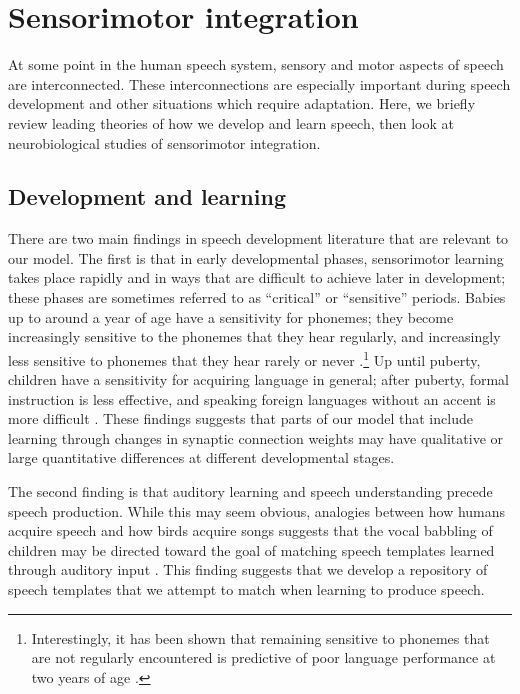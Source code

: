 \section{Sensorimotor integration}

At some point in the human speech system,
sensory and motor aspects of speech
are interconnected.
These interconnections are especially important
during speech development
and other situations which require adaptation.
Here, we briefly review leading theories
of how we develop and learn speech,
then look at neurobiological studies
of sensorimotor integration.

\subsection{Development and learning}

There are two main findings in
speech development literature
that are relevant to our model.
The first is that in
early developmental phases,
sensorimotor learning
takes place rapidly
and in ways that are difficult
to achieve later in development;
these phases are sometimes referred
to as ``critical'' or ``sensitive'' periods.
Babies up to around a year of age
have a sensitivity for phonemes;
they become increasingly sensitive
to the phonemes that they hear regularly,
and increasingly less sensitive
to phonemes that they hear rarely or never
\citep{kuhl2008}.\footnote{
  Interestingly, it has been shown that
  remaining sensitive to phonemes
  that are not regularly encountered
  is predictive of poor language performance
  at two years of age \citep{kuhl2008}.}
Up until puberty,
children have a sensitivity for
acquiring language in general;
after puberty, formal instruction
is less effective,
and speaking foreign languages
without an accent is more difficult
\citep{hurford1991}.
These findings suggests that
parts of our model
that include learning
through changes in synaptic connection weights
may have qualitative or large quantitative
differences at different developmental stages.

The second finding is that
auditory learning
and speech understanding precede
speech production.
While this may seem obvious,
analogies between how humans acquire speech
and how birds acquire songs suggests that
the vocal babbling of children
may be directed toward the goal of
matching speech templates learned
through auditory input
\citep{bolhuis2010}.
This finding suggests that
we develop a repository of speech templates
that we attempt to match when
learning to produce speech.

